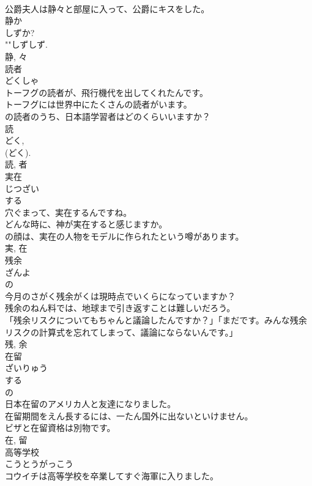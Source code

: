 \documentclass[8pt]{extreport}
\begin{document}
\begin{CJK}{UTF8}{min}
\\	公爵夫人は静々と部屋に入って、公爵にキスをした。	
\\	静か 
\\	しずか? 
\\	""しずしず.
\\	静, 々	
\\	読者	
\\	どくしゃ	
\\	トーフグの読者が、飛行機代を出してくれたんです。	
\\	トーフグには世界中にたくさんの読者がいます。	
\\	の読者のうち、日本語学習者はどのくらいいますか？	
\\	読 
\\	どく, 
\\	(どく). 
\\	読, 者	
\\	実在	
\\	じつざい	
\\	する 
\\	穴ぐまって、実在するんですね。	
\\	どんな時に、神が実在すると感じますか。	
\\	の顔は、実在の人物をモデルに作られたという噂があります。	
\\	実, 在	
\\	残余	
\\	ざんよ	
\\	の 
\\	今月のさがく残余がくは現時点でいくらになっていますか？	
\\	残余のねん料では、地球まで引き返すことは難しいだろう。	
\\	「残余リスクについてもちゃんと議論したんですか？」「まだです。みんな残余リスクの計算式を忘れてしまって、議論にならないんです。」	
\\	残, 余	
\\	在留	
\\	ざいりゅう	
\\	する 
\\	の 
\\	日本在留のアメリカ人と友達になりました。	
\\	在留期間をえん長するには、一たん国外に出ないといけません。	
\\	ビザと在留資格は別物です。	
\\	在, 留	
\\	高等学校	
\\	こうとうがっこう	
\\	コウイチは高等学校を卒業してすぐ海軍に入りました。	

\end{CJK}
\end{document}
